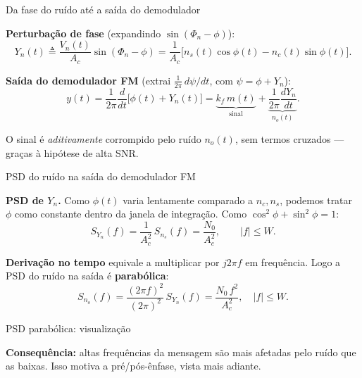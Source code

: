 
\begin{frame}{Da fase do ruído até a saída do demodulador}

\textbf{Perturbação de fase} (expandindo $\sin(\Phi_n - \phi)$):
\[
Y_n(t) \triangleq \frac{V_n(t)}{A_c}\sin(\Phi_n - \phi) = \frac{1}{A_c}\bigl[n_s(t)\cos\phi(t) - n_c(t)\sin\phi(t)\bigr].
\]

\textbf{Saída do demodulador FM} (extrai $\tfrac{1}{2\pi}\,d\psi/dt$, com $\psi = \phi + Y_n$):
\[
y(t) = \frac{1}{2\pi}\frac{d}{dt}\bigl[\phi(t) + Y_n(t)\bigr]
     = \underbrace{k_f\, m(t)}_{\text{sinal}} + \underbrace{\frac{1}{2\pi}\frac{dY_n}{dt}}_{n_o(t)}.
\]

O sinal é \emph{aditivamente} corrompido pelo ruído $n_o(t)$, sem termos cruzados — graças à hipótese de alta SNR.

\end{frame}


\begin{frame}{PSD do ruído na saída do demodulador FM}

\textbf{PSD de $Y_n$.} Como $\phi(t)$ varia lentamente comparado a $n_c, n_s$, podemos tratar $\phi$ como constante dentro da janela de integração. Como $\cos^2\phi + \sin^2\phi = 1$:
\[
S_{Y_n}(f) = \frac{1}{A_c^2}\,S_{n_s}(f) = \frac{N_0}{A_c^2}, \qquad |f| \le W.
\]

\textbf{Derivação no tempo} equivale a multiplicar por $j2\pi f$ em frequência. Logo a PSD do ruído na saída é \textbf{parabólica}:
\[
S_{n_o}(f) = \frac{(2\pi f)^2}{(2\pi)^2}\,S_{Y_n}(f) = \frac{N_0\, f^2}{A_c^2}, \quad |f| \le W.
\]

\end{frame}


\begin{frame}{PSD parabólica: visualização}

\begin{center}
\end{center}

\textbf{Consequência:} altas frequências da mensagem são mais afetadas pelo ruído que as baixas. Isso motiva a pré/pós-ênfase, vista mais adiante.

\end{frame}


